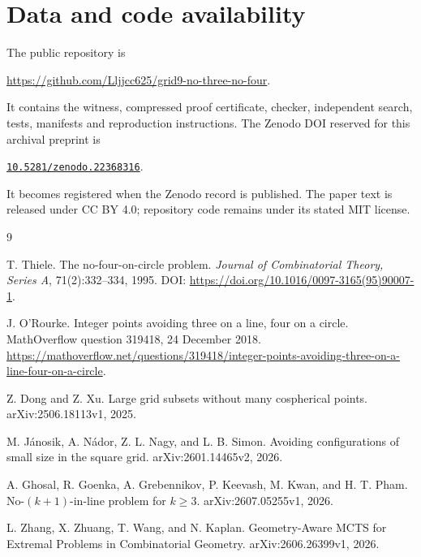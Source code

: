 \documentclass[11pt,a4paper]{article}
\theoremstyle{definition}
\theoremstyle{remark}
\begin{document}
\section*{Data and code availability}
The public repository is
\begin{center}
\url{https://github.com/Lljjcc625/grid9-no-three-no-four}.
\end{center}
It contains the witness, compressed proof certificate, checker, independent
search, tests, manifests and reproduction instructions. The Zenodo DOI reserved for this archival preprint is
\begin{center}
\href{https://doi.org/10.5281/zenodo.22368316}{\texttt{10.5281/zenodo.22368316}}.
\end{center}
It becomes registered when the Zenodo record is published. The paper text is
released under CC BY 4.0; repository code remains under its stated MIT license.

\begin{thebibliography}{9}

T. Thiele.
\newblock The no-four-on-circle problem.
\newblock \emph{Journal of Combinatorial Theory, Series A}, 71(2):332--334, 1995.
\newblock DOI: \url{https://doi.org/10.1016/0097-3165(95)90007-1}.

J. O'Rourke.
\newblock Integer points avoiding three on a line, four on a circle.
\newblock MathOverflow question 319418, 24 December 2018.
\newblock \url{https://mathoverflow.net/questions/319418/integer-points-avoiding-three-on-a-line-four-on-a-circle}.

Z. Dong and Z. Xu.
\newblock Large grid subsets without many cospherical points.
\newblock arXiv:2506.18113v1, 2025.

M. J\'anosik, A. N\'ador, Z. L. Nagy, and L. B. Simon.
\newblock Avoiding configurations of small size in the square grid.
\newblock arXiv:2601.14465v2, 2026.

A. Ghosal, R. Goenka, A. Grebennikov, P. Keevash, M. Kwan, and H. T. Pham.
\newblock No-$(k+1)$-in-line problem for $k\ge3$.
\newblock arXiv:2607.05255v1, 2026.

L. Zhang, X. Zhuang, T. Wang, and N. Kaplan.
\newblock Geometry-Aware MCTS for Extremal Problems in Combinatorial Geometry.
\newblock arXiv:2606.26399v1, 2026.

\end{thebibliography}
\end{document}
